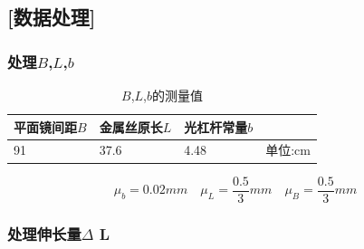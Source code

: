 \documentclass[UTF8]{article} %
\begin{document}
	\subsection*{[数据处理]}
	

\subsubsection*{处理$B$,$L$,$b$}
\begin{table}[h]
	\centering
	\begin{tabular}{|l|l|l|l|}
		\hline
		平面镜间距$B$ & 金属丝原长$L$ & 光杠杆常量$b$ &      \\ \hline
		91     & 37.6   & 4.48  & 单位:cm \\ \hline
	\end{tabular}
	\caption{$B$,$L$,$b$的测量值}
\end{table}
\[\mu_{b}=0.02mm \quad\mu_L = \frac{0.5}{3}mm \quad\mu_B = \frac{0.5}{3}mm\]
\subsubsection*{处理伸长量$\Delta$ L}
\end{document}
